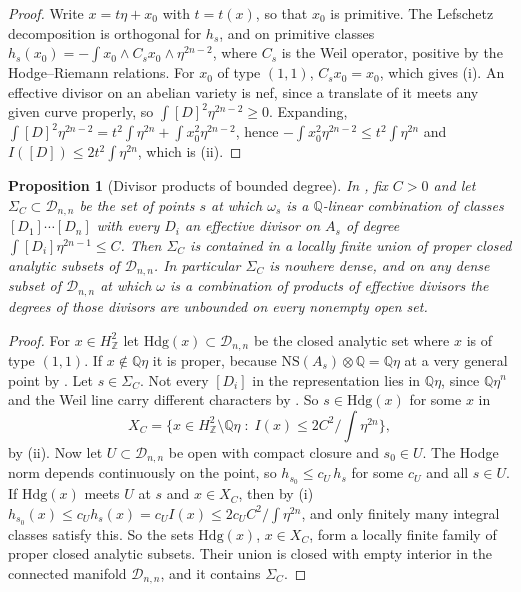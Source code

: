 \documentclass[11pt,reqno]{amsart}
\theoremstyle{plain}
\newtheorem{proposition}[theorem]{Proposition}
\theoremstyle{definition}
\theoremstyle{remark}
\newcommand{\QQ}{\mathbb{Q}}
\newcommand{\ZZ}{\mathbb{Z}}
\newcommand{\cD}{\mathcal{D}}
\newcommand{\NS}{\mathrm{NS}}
\begin{document}
\begin{proof}
Write $x=t\eta+x_{0}$ with $t=t(x)$, so that $x_{0}$ is primitive. The
Lefschetz decomposition is orthogonal for $h_{s}$, and on primitive classes
$h_{s}(x_{0})=-\int x_{0}\wedge C_{s}x_{0}\wedge\eta^{2n-2}$, where $C_{s}$ is
the Weil operator, positive by the Hodge--Riemann relations. For $x_{0}$ of type
$(1,1)$, $C_{s}x_{0}=x_{0}$, which gives (i). An effective divisor on an
abelian variety is nef, since a translate of it meets any given curve
properly, so $\int[D]^{2}\eta^{2n-2}\ge0$. Expanding,
$\int[D]^{2}\eta^{2n-2}=t^{2}\int\eta^{2n}+\int x_{0}^{2}\eta^{2n-2}$, hence
$-\int x_{0}^{2}\eta^{2n-2}\le t^{2}\int\eta^{2n}$ and
$I([D])\le2t^{2}\int\eta^{2n}$, which is (ii).
\end{proof}

\begin{proposition}[Divisor products of bounded degree]\label{prop:divroute}
In , fix $C>0$ and let $\Sigma_{C}\subset\cD_{n,n}$ be the
set of points $s$ at which $\omega_{s}$ is a $\QQ$-linear combination of
classes $[D_{1}]\cdots[D_{n}]$ with every $D_{i}$ an effective divisor on
$A_{s}$ of degree $\int[D_{i}]\eta^{2n-1}\le C$. Then $\Sigma_{C}$ is
contained in a locally finite union of proper closed analytic subsets of
$\cD_{n,n}$. In particular $\Sigma_{C}$ is nowhere dense, and on any dense
subset of $\cD_{n,n}$ at which $\omega$ is a combination of products of
effective divisors the degrees of those divisors are unbounded on every
nonempty open set.
\end{proposition}

\begin{proof}
For $x\in H^{2}_{\ZZ}$ let $\mathrm{Hdg}(x)\subset\cD_{n,n}$ be the
closed analytic set where $x$ is of type $(1,1)$. If $x\notin\QQ\eta$ it is
proper, because $\NS(A_{s})\otimes\QQ=\QQ\eta$ at a very general point by
. Let $s\in\Sigma_{C}$. Not every $[D_{i}]$ in the
representation lies in $\QQ\eta$, since $\QQ\eta^{n}$ and the Weil line carry
different characters by . So $s\in\mathrm{Hdg}(x)$ for
some $x$ in
\[
  X_{C}=\bigl\{x\in H^{2}_{\ZZ}\setminus\QQ\eta\;:\;
  I(x)\le 2C^{2}/\textstyle\int\eta^{2n}\bigr\},
\]
by (ii). Now let $U\subset\cD_{n,n}$ be open with compact
closure and $s_{0}\in U$. The Hodge norm depends continuously on the point, so
$h_{s_{0}}\le c_{U}\,h_{s}$ for some $c_{U}$ and all $s\in U$. If
$\mathrm{Hdg}(x)$ meets $U$ at $s$ and $x\in X_{C}$, then by
(i)
$h_{s_{0}}(x)\le c_{U}h_{s}(x)=c_{U}I(x)\le 2c_{U}C^{2}/\int\eta^{2n}$, and
only finitely many integral classes satisfy this. So the sets
$\mathrm{Hdg}(x)$, $x\in X_{C}$, form a locally finite family of proper closed
analytic subsets. Their union is closed with empty interior in the connected
manifold $\cD_{n,n}$, and it contains $\Sigma_{C}$.
\end{proof}
\end{document}
